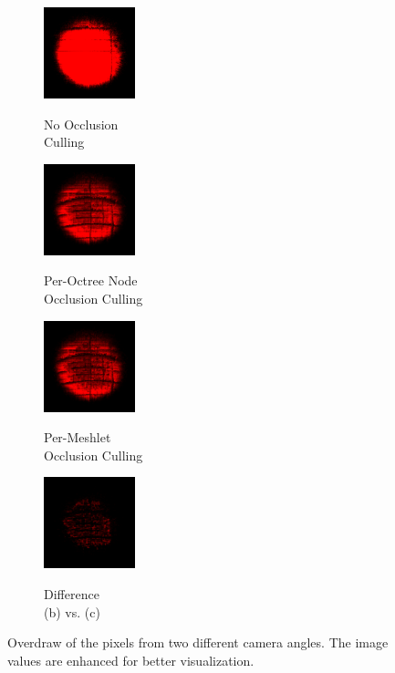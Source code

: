 \begin{figure}[!htb]
  \begin{subfigure}{100px}
    \includegraphics[height=100px]{images/graphics/overdraw-hairball2-nocull.png}
    \caption{}
    \parbox{\linewidth}{\centering\footnotesize No Occlusion\\Culling}
  \end{subfigure}
  \begin{subfigure}{100px}
    \includegraphics[height=100px]{images/graphics/overdraw-hairball2-pooc.png}
    \caption{}
    \parbox{\linewidth}{\centering\footnotesize Per-Octree Node\\Occlusion Culling}
  \end{subfigure}
  \begin{subfigure}{100px}
    \includegraphics[height=100px]{images/graphics/overdraw-hairball2-pmoc.png}
    \caption{}
    \parbox{\linewidth}{\centering\footnotesize Per-Meshlet\\Occlusion Culling}
  \end{subfigure}
  \begin{subfigure}{100px}
    \includegraphics[height=100px]{images/graphics/overdraw-hairball2-diff.png}
    \caption{}
    \parbox{\linewidth}{\centering\footnotesize Difference\\(b) vs. (c)}
  \end{subfigure}

  \caption{Overdraw of the pixels from two different camera angles. 
  The image values are enhanced for better visualization.}
  \label{fig:hairball-overdraw}
\end{figure}

